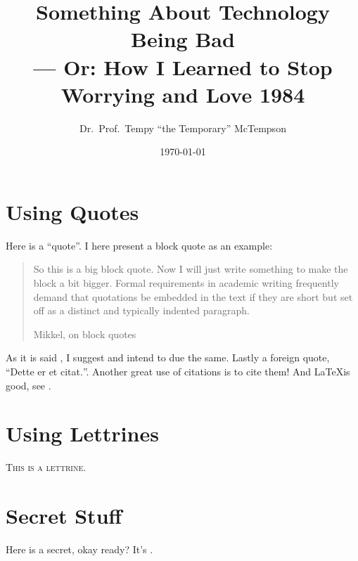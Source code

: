 \documentclass[a4paper, 12pt]{article}
\title{
    Something About Technology Being Bad
    \\\large %
    --- Or: How I Learned to Stop Worrying and Love 1984
}
\author{Dr.\ Prof.\ Tempy ``the Temporary'' McTempson}
\date{\today}
\begin{document}
\maketitle

\Blindtext %

\section{Using Quotes}
Here is a \enquote{quote}.
I here present a block quote as an example:
\blockquote[Mikkel, on block quotes]{
    So this is a big block quote.
    Now I will just write something to make the block a bit bigger.
    Formal requirements in academic writing frequently demand that quotations
    be embedded in the text if they are short but set off as a distinct and
    typically indented paragraph.
}
As it is said
,
I suggest and intend to due the same.
Lastly a foreign quote, \foreignquote{danish}{Dette er et citat.}.
Another great use of citations is to cite them!
And \LaTeX is good, see \cite{greenwade93}.


\section{Using Lettrines}
\lettrine{T}{his is a lettrine.} \blindtext

\section{Secret Stuff}
Here is a secret, okay ready? It's .

\printbibliography
\end{document}
